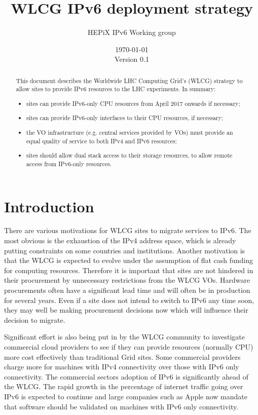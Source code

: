\documentclass[11pt]{article}
\begin{document}
\title{WLCG IPv6 deployment strategy}
\author{HEPiX IPv6 Working group}
\date{\today \\ Version 0.1}
\maketitle

\renewcommand{\abstractname}{Executive Summary}
\begin{abstract}
This document describes the Worldwide LHC Computing Grid's (WLCG) strategy to allow sites to provide IPv6 resources to the LHC experiments. In summary:
\begin{itemize}
\item sites can provide IPv6-only CPU resources from April 2017 onwards if necessary;
\item sites can provide IPv6-only interfaces to their CPU resources, if necessary;
\item the VO infrastructure (e.g. central services provided by VOs) must provide an equal quality of service to both IPv4 and IPv6 resources;
\item sites should allow dual stack access to their storage resources, to allow remote access from IPv6-only resources.
\end{itemize}
\end{abstract}

\newpage
\tableofcontents
\newpage

\section{Introduction}
There are various motivations for WLCG sites to migrate services to IPv6. The most obvious is the exhaustion of the IPv4 address space, which is already putting constraints on some countries and institutions. Another motivation is that the WLCG is expected to evolve under the assumption
of flat cash funding for computing resources. Therefore it is important that sites are not hindered in their procurement by unnecessary restrictions from the WLCG VOs. Hardware procurements often have a significant lead time and will often be in production for several years.  Even if a site does not intend to switch to IPv6 any time soon, they may well be making procurement decisions now which will influence their decision to migrate.

Significant effort is also being put in by the WLCG community to investigate commercial cloud providers to see if they can provide resources (normally CPU) more cost effectively than traditional Grid sites\cite{CheapIPv6}.  Some commercial providers charge more for machines with IPv4 connectivity over those with IPv6 only connectivity.  The commercial sectors adoption of IPv6 is significantly ahead of the WLCG.  The rapid growth in the percentage of internet traffic going over IPv6 is expected to continue and large companies such as Apple now mandate that software should be validated on machines with IPv6 only connectivity\cite{ApplePolicy}.
\end{document}

